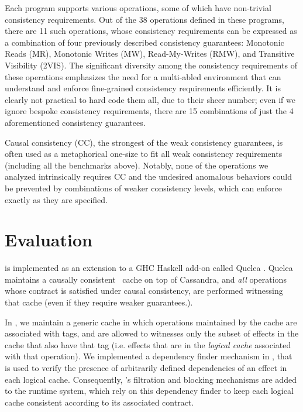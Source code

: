 \documentclass[authorversion]{sig-alternate-05-2015}
\begin{document}
Each program supports various operations, some of which have
non-trivial consistency requirements. Out of the 38 operations
defined in these programs, there are 11 such operations, whose
consistency requirements can be expressed as a combination of four
previously described consistency guarantees: Monotonic Reads (MR),
Monotonic Writes (MW), Read-My-Writes (RMW), and Transitive Visibility
(2VIS). The significant diversity among the consistency requirements
of these operations emphasizes the need for a multi-abled environment
that can understand and enforce fine-grained consistency requirements
efficiently. 
It is clearly not practical to hard code them all, due to
their sheer number; even if we ignore bespoke consistency
requirements, there are 15 combinations of just the 4 aforementioned
consistency guarantees. 

Causal
consistency (CC), the strongest of the weak consistency guarantees, is
often used as a metaphorical one-size to fit all weak consistency
requirements (including all the benchmarks above).  Notably, none of the operations we analyzed
intrinsically requires CC and the undesired anomalous behaviors could be prevented by combinations of weaker consistency levels, which \tool\; can enforce exactly as they are specified.


















\section{Evaluation}
\tool\; is implemented as an extension to a GHC Haskell add-on called
Quelea \cite{quelea}.  Quelea maintains a causally
consistent~\cite{bolton} cache on top of Cassandra, and \emph{all}
operations whose contract is satisfied under causal consistency, are
performed witnessing that cache (even if they require weaker
guarantees.).

In \tool, we maintain a generic cache in which operations maintained
by the cache are associated with tags, and are allowed to witnesses
only the subset of effects in the cache that also have that tag
(i.e. effects that are in the \emph{logical cache} associated with
that operation). We implemented a dependency finder mechanism in
\tool, that is used to verify the presence of arbitrarily defined
dependencies of an effect in each logical cache. Consequently, \tool's
filtration and blocking mechanisms are added to the runtime system,
which rely on this dependency finder to keep each logical cache
consistent according to its associated contract.
\end{document}
